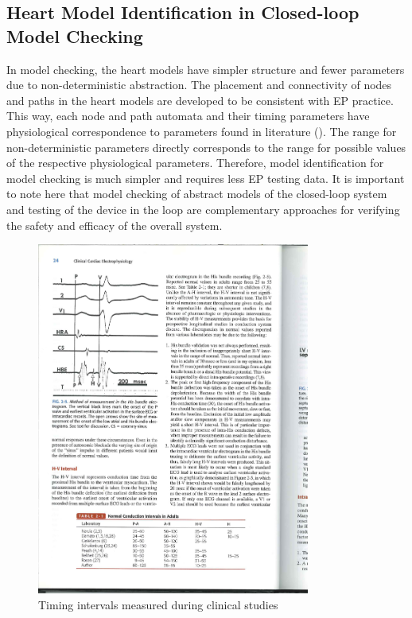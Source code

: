 \subsection{Heart Model Identification in Closed-loop Model Checking}
In model checking, the heart models have simpler structure and fewer parameters due to non-deterministic abstraction. The placement and connectivity of nodes and paths in the heart models are developed to be consistent with EP practice. This way, each node and path automata and their timing parameters have physiological correspondence to parameters found in literature (). The range for non-deterministic parameters directly corresponds to the range for possible values of the respective physiological parameters. Therefore, model identification for model checking is much simpler and requires less EP testing data. It is important to note here that model checking of abstract models of the closed-loop system and testing of the device in the loop are complementary approaches for verifying the safety and efficacy of the overall system. 

\begin{figure}[!t]
\centering
		\includegraphics[width=0.8\textwidth]{figs/intervals.pdf}
		
\caption{\small Timing intervals measured during clinical studies \cite{josephson}}
\label{fig:intervals}
\end{figure} 



